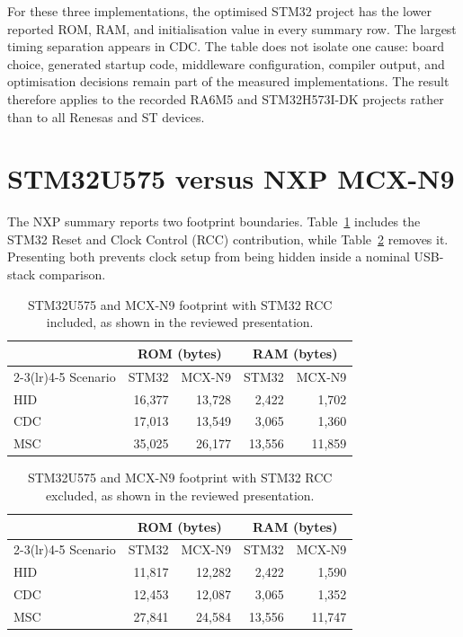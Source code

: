 For these three implementations, the optimised STM32 project has the lower reported ROM,
RAM, and initialisation value in every summary row. The largest timing separation appears
in CDC. The table does not isolate one cause: board choice, generated startup code,
middleware configuration, compiler output, and optimisation decisions remain part of the
measured implementations. The result therefore applies to the recorded RA6M5 and
STM32H573I-DK projects rather than to all Renesas and ST devices.

\section{STM32U575 versus NXP MCX-N9}
\label{sec:cascade-pilot-nxp}

The NXP summary reports two footprint boundaries. Table~\ref{tab:cascade-nxp-with-rcc}
includes the STM32 Reset and Clock Control (RCC) contribution, while
Table~\ref{tab:cascade-nxp-without-rcc} removes it. Presenting both prevents clock setup
from being hidden inside a nominal USB-stack comparison.

\begin{table}[H]
\centering
\small
\caption{STM32U575 and MCX-N9 footprint with STM32 RCC included, as shown in the reviewed presentation.}
\label{tab:cascade-nxp-with-rcc}
\begin{tabular}{lrrrr}
\toprule
& \multicolumn{2}{c}{ROM (bytes)} & \multicolumn{2}{c}{RAM (bytes)} \\
\cmidrule(lr){2-3}\cmidrule(lr){4-5}
Scenario & STM32 & MCX-N9 & STM32 & MCX-N9 \\
\midrule
HID & 16,377 & 13,728 & 2,422 & 1,702 \\
CDC & 17,013 & 13,549 & 3,065 & 1,360 \\
MSC & 35,025 & 26,177 & 13,556 & 11,859 \\
\bottomrule
\end{tabular}
\end{table}

\begin{table}[H]
\centering
\small
\caption{STM32U575 and MCX-N9 footprint with STM32 RCC excluded, as shown in the reviewed presentation.}
\label{tab:cascade-nxp-without-rcc}
\begin{tabular}{lrrrr}
\toprule
& \multicolumn{2}{c}{ROM (bytes)} & \multicolumn{2}{c}{RAM (bytes)} \\
\cmidrule(lr){2-3}\cmidrule(lr){4-5}
Scenario & STM32 & MCX-N9 & STM32 & MCX-N9 \\
\midrule
HID & 11,817 & 12,282 & 2,422 & 1,590 \\
CDC & 12,453 & 12,087 & 3,065 & 1,352 \\
MSC & 27,841 & 24,584 & 13,556 & 11,747 \\
\bottomrule
\end{tabular}
\end{table}


